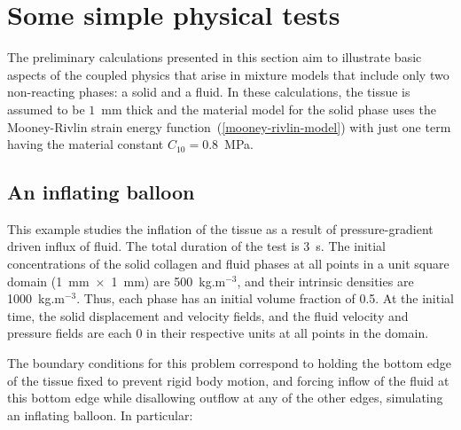 \section{Some simple physical tests}
\label{simple-physics}

The preliminary calculations presented in this section aim to
illustrate basic aspects of the coupled physics that arise in mixture
models that include only two non-reacting phases: a solid and a
fluid. In these calculations, the tissue is assumed to be $1$~mm thick
and the material model for the solid phase uses the Mooney-Rivlin
strain energy function~(\ref{mooney-rivlin-model}) with just one term
having the material constant \mbox{$C_{10} = 0.8$~MPa.}

\subsection{An inflating balloon}
\label{balloon}

This example studies the inflation of the tissue as a result of
pressure-gradient driven influx of fluid.  The total duration of the
test is 3~s. The initial concentrations of the solid collagen and
fluid phases at all points in a unit square domain \mbox{(1~mm
  $\times$ 1~mm)} are 500~kg.m$^{-3}$, and their intrinsic densities
are 1000~kg.m$^{-3}$. Thus, each phase has an initial volume fraction
of 0.5. At the initial time, the solid displacement and velocity
fields, and the fluid velocity and pressure fields are each 0 in their
respective units at all points in the domain.

The boundary conditions for this problem correspond to holding the
bottom edge of the tissue fixed to prevent rigid body motion, and
forcing inflow of the fluid at this bottom edge while disallowing
outflow at any of the other edges, simulating an inflating balloon. In
particular:


